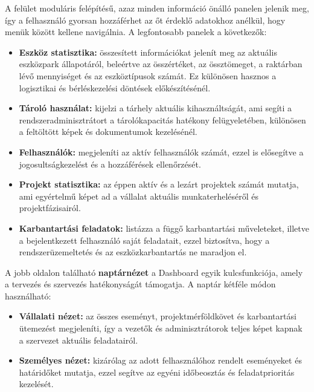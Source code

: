 A felület moduláris felépítésű, azaz minden információ önálló panelen jelenik meg, 
így a felhasználó gyorsan hozzáférhet az őt érdeklő adatokhoz anélkül, hogy menük között kellene navigálnia.  
A legfontosabb panelek a következők:

\begin{itemize}
    \item \textbf{Eszköz statisztika:} összesített információkat jelenít meg az aktuális eszközpark állapotáról, 
    beleértve az összértéket, az össztömeget, a raktárban lévő mennyiséget és az eszköztípusok számát.  
    Ez különösen hasznos a logisztikai és bérléskezelési döntések előkészítésénél.
    
    \item \textbf{Tároló használat:} kijelzi a tárhely aktuális kihasználtságát, ami segíti a rendszeradminisztrátort a 
    tárolókapacitás hatékony felügyeletében, különösen a feltöltött képek és dokumentumok kezelésénél.
    
    \item \textbf{Felhasználók:} megjeleníti az aktív felhasználók számát, ezzel is elősegítve a jogosultságkezelést és a hozzáférések ellenőrzését.
    
    \item \textbf{Projekt statisztika:} az éppen aktív és a lezárt projektek számát mutatja, 
    ami egyértelmű képet ad a vállalat aktuális munkaterheléséről és projektfázisairól.
    
    \item \textbf{Karbantartási feladatok:} listázza a függő karbantartási műveleteket, illetve a bejelentkezett felhasználó saját feladatait, 
    ezzel biztosítva, hogy a rendszerüzemeltetés és az eszközkarbantartás ne maradjon el.
\end{itemize}

A jobb oldalon található \textbf{naptárnézet} a Dashboard egyik kulcsfunkciója, amely a tervezés és szervezés hatékonyságát támogatja.  
A naptár kétféle módon használható:

\begin{itemize}
    \item \textbf{Vállalati nézet:} az összes eseményt, projektmérföldkövet és karbantartási ütemezést megjeleníti, így a vezetők és adminisztrátorok 
    teljes képet kapnak a szervezet aktuális feladatairól.
    \item \textbf{Személyes nézet:} kizárólag az adott felhasználóhoz rendelt eseményeket és határidőket mutatja, 
    ezzel segítve az egyéni időbeosztás és feladatprioritás kezelését.
\end{itemize}

